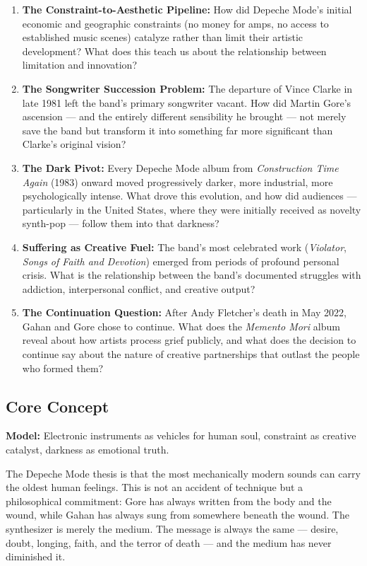 \documentclass[11pt,letterpaper]{article}
\begin{document}
\begin{enumerate}
  \item \textbf{The Constraint-to-Aesthetic Pipeline:} How did Depeche Mode's initial economic and geographic constraints (no money for amps, no access to established music scenes) catalyze rather than limit their artistic development? What does this teach us about the relationship between limitation and innovation?

  \item \textbf{The Songwriter Succession Problem:} The departure of Vince Clarke in late 1981 left the band's primary songwriter vacant. How did Martin Gore's ascension --- and the entirely different sensibility he brought --- not merely save the band but transform it into something far more significant than Clarke's original vision?

  \item \textbf{The Dark Pivot:} Every Depeche Mode album from \textit{Construction Time Again} (1983) onward moved progressively darker, more industrial, more psychologically intense. What drove this evolution, and how did audiences --- particularly in the United States, where they were initially received as novelty synth-pop --- follow them into that darkness?

  \item \textbf{Suffering as Creative Fuel:} The band's most celebrated work (\textit{Violator}, \textit{Songs of Faith and Devotion}) emerged from periods of profound personal crisis. What is the relationship between the band's documented struggles with addiction, interpersonal conflict, and creative output?

  \item \textbf{The Continuation Question:} After Andy Fletcher's death in May 2022, Gahan and Gore chose to continue. What does the \textit{Memento Mori} album reveal about how artists process grief publicly, and what does the decision to continue say about the nature of creative partnerships that outlast the people who formed them?
\end{enumerate}

\subsection{Core Concept}

\textbf{Model:} Electronic instruments as vehicles for human soul, constraint as creative catalyst, darkness as emotional truth.

The Depeche Mode thesis is that the most mechanically modern sounds can carry the oldest human feelings. This is not an accident of technique but a philosophical commitment: Gore has always written from the body and the wound, while Gahan has always sung from somewhere beneath the wound. The synthesizer is merely the medium. The message is always the same --- desire, doubt, longing, faith, and the terror of death --- and the medium has never diminished it.
\end{document}
